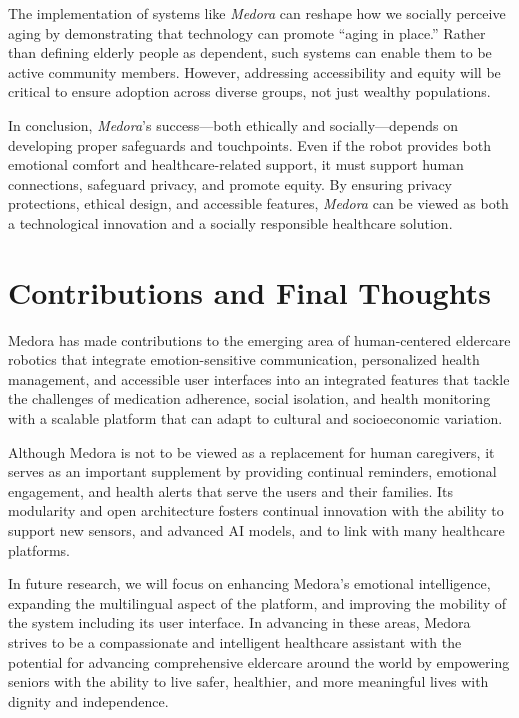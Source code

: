 The implementation of systems like \textit{Medora} can reshape how we socially perceive aging by demonstrating that technology can promote ``aging in place.'' Rather than defining elderly people as dependent, such systems can enable them to be active community members. However, addressing accessibility and equity will be critical to ensure adoption across diverse groups, not just wealthy populations.

In conclusion, \textit{Medora}'s success—both ethically and socially—depends on developing proper safeguards and touchpoints. Even if the robot provides both emotional comfort and healthcare-related support, it must support human connections, safeguard privacy, and promote equity. By ensuring privacy protections, ethical design, and accessible features, \textit{Medora} can be viewed as both a technological innovation and a socially responsible healthcare solution.



\section{Contributions and Final Thoughts}

Medora has made contributions to the emerging area of human-centered eldercare robotics that integrate emotion-sensitive communication, personalized health management, and accessible user interfaces into an integrated features that tackle the challenges of medication adherence, social isolation, and health monitoring with a scalable platform that can adapt to cultural and socioeconomic variation. 

Although Medora is not to be viewed as a replacement for human caregivers, it serves as an important supplement by providing continual reminders, emotional engagement, and health alerts that serve the users and their families. Its modularity and open architecture fosters continual innovation with the ability to support new sensors, and advanced AI models, and to link with many healthcare platforms.

In future research, we will focus on enhancing Medora’s emotional intelligence, expanding the multilingual aspect of the platform, and improving the mobility of the system including its user interface. In advancing in these areas, Medora strives to be a compassionate and intelligent healthcare assistant with the potential for advancing comprehensive eldercare around the world by empowering seniors with the ability to live safer, healthier, and more meaningful lives with dignity and independence.


